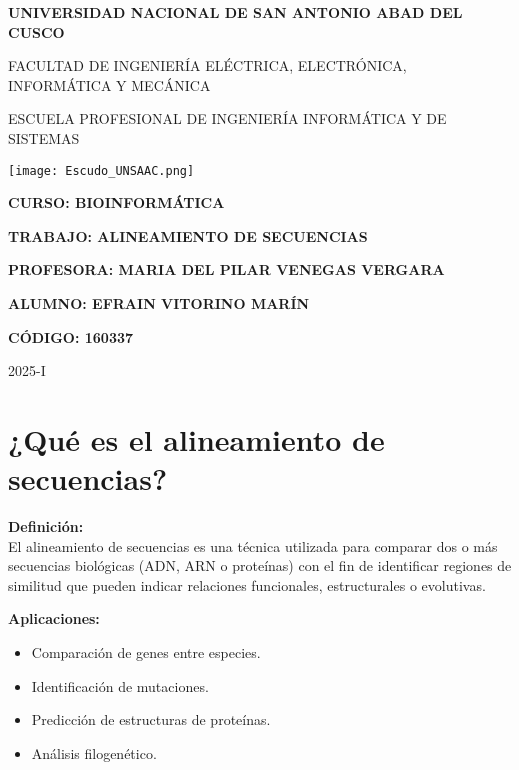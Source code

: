 \documentclass[fleqn,10pt]{article}
\begin{document}
\begin{titlepage}
    \centering
    \vspace*{1cm}
    {\LARGE\bfseries UNIVERSIDAD NACIONAL DE SAN ANTONIO ABAD DEL CUSCO\par}
    \vspace{0.5cm}
    {\Large FACULTAD DE INGENIERÍA ELÉCTRICA, ELECTRÓNICA, INFORMÁTICA Y MECÁNICA\par}
    \vspace{0.5cm}
    {\Large ESCUELA PROFESIONAL DE INGENIERÍA INFORMÁTICA Y DE SISTEMAS\par}
    \vfill
    \texttt{[image: Escudo\_UNSAAC.png]}\par %
    \vfill
    {\Large\bfseries CURSO: BIOINFORMÁTICA\par}
    \vspace{0.3cm}
    {\Large\bfseries TRABAJO: ALINEAMIENTO DE SECUENCIAS\par}
    \vspace{0.3cm}
    {\Large\bfseries PROFESORA: MARIA DEL PILAR VENEGAS VERGARA\par}
    \vspace{1cm}
    {\Large\bfseries ALUMNO: EFRAIN VITORINO MARÍN\par}
    {\Large\bfseries CÓDIGO: 160337\par}
    \vfill
    {\Large 2025-I\par}
\end{titlepage}

\setcounter{page}{1}
\pagestyle{plain}
\tableofcontents
\newpage


\section{¿Qué es el alineamiento de secuencias?}
\textbf{Definición:} \\
El alineamiento de secuencias es una técnica utilizada para comparar dos o más secuencias biológicas (ADN, ARN o proteínas) con el fin de identificar regiones de similitud que pueden indicar relaciones funcionales, estructurales o evolutivas.

\textbf{Aplicaciones:}
\begin{itemize}
    \item Comparación de genes entre especies.
    \item Identificación de mutaciones.
    \item Predicción de estructuras de proteínas.
    \item Análisis filogenético.
\end{itemize}
\end{document}
